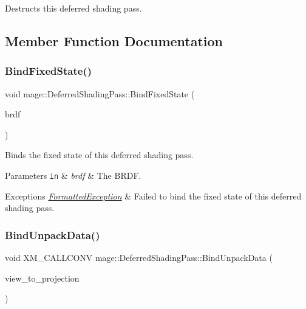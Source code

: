 Destructs this deferred shading pass. 

\subsection{Member Function Documentation}
\hypertarget{classmage_1_1_deferred_shading_pass_aa6e4edd14aeaf5388b1f57388dd3aa3e}{}\label{classmage_1_1_deferred_shading_pass_aa6e4edd14aeaf5388b1f57388dd3aa3e} 
\subsubsection{\texorpdfstring{Bind\+Fixed\+State()}{BindFixedState()}}
{\footnotesize\ttfamily void mage\+::\+Deferred\+Shading\+Pass\+::\+Bind\+Fixed\+State (\begin{DoxyParamCaption}\item[{\hyperlink{namespacemage_ae7a7a03a7b34d7e2689689bb8295cd38}{B\+R\+D\+F\+Type}}]{brdf }\end{DoxyParamCaption})}

Binds the fixed state of this deferred shading pass.


\begin{DoxyParams}[1]{Parameters}
\mbox{\tt in}  & {\em brdf} & The B\+R\+DF. \\
\hline
\end{DoxyParams}

\begin{DoxyExceptions}{Exceptions}
{\em \hyperlink{structmage_1_1_formatted_exception}{Formatted\+Exception}} & Failed to bind the fixed state of this deferred shading pass. \\
\hline
\end{DoxyExceptions}
\hypertarget{classmage_1_1_deferred_shading_pass_aea109ccc921eb53ce00a5803c5dbbea4}{}\label{classmage_1_1_deferred_shading_pass_aea109ccc921eb53ce00a5803c5dbbea4} 
\subsubsection{\texorpdfstring{Bind\+Unpack\+Data()}{BindUnpackData()}}
{\footnotesize\ttfamily void X\+M\+\_\+\+C\+A\+L\+L\+C\+O\+NV mage\+::\+Deferred\+Shading\+Pass\+::\+Bind\+Unpack\+Data (\begin{DoxyParamCaption}\item[{F\+X\+M\+M\+A\+T\+R\+IX}]{view\+\_\+to\+\_\+projection }\end{DoxyParamCaption})\hspace{0.3cm}{\ttfamily [private]}}


